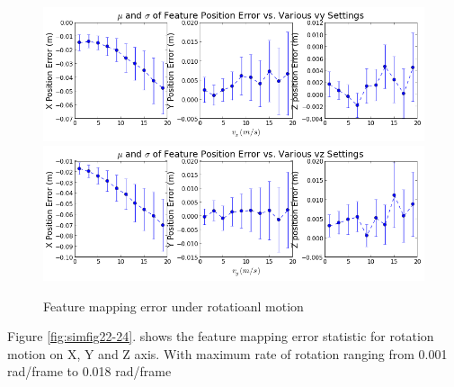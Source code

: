 \begin{figure}[h]
  \centering
  \includegraphics[scale=0.5]{./Figures/SimulationFigures/Figure20.png}
  \includegraphics[scale=0.5]{./Figures/SimulationFigures/Figure21.png}
  \caption{Feature mapping error under rotatioanl motion}
  \label{fig:simfig20-21}
\end{figure}

Figure \ref{fig:simfig22-24}. shows the feature mapping error statistic 
for rotation motion on X, Y and Z axis. With maximum rate of rotation 
ranging from 0.001 rad/frame to 0.018 rad/frame

